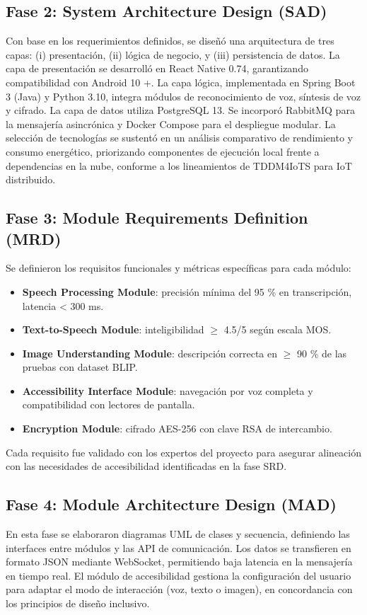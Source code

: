 \documentclass[lettersize,journal]{IEEEtran}
\begin{document}
        \subsection{Fase 2: System Architecture Design (SAD)}
        Con base en los requerimientos definidos, se diseñó una arquitectura de tres capas: (i) presentación, (ii) lógica de negocio, y (iii) persistencia de datos.  
        La capa de presentación se desarrolló en React Native 0.74, garantizando compatibilidad con Android 10 +.  
        La capa lógica, implementada en Spring Boot 3 (Java) y Python 3.10, integra módulos de reconocimiento de voz, síntesis de voz y cifrado.  
        La capa de datos utiliza PostgreSQL 13. Se incorporó RabbitMQ para la mensajería asincrónica y Docker Compose para el despliegue modular.  
        La selección de tecnologías se sustentó en un análisis comparativo de rendimiento y consumo energético, priorizando componentes de ejecución local frente a dependencias en la nube, conforme a los lineamientos de TDDM4IoTS para IoT distribuido.
        
        \subsection{Fase 3: Module Requirements Definition (MRD)}
        Se definieron los requisitos funcionales y métricas específicas para cada módulo:  
        \begin{itemize}
            \item \textbf{Speech Processing Module}: precisión mínima del 95 \% en transcripción, latencia < 300 ms.  
            \item \textbf{Text-to-Speech Module}: inteligibilidad $\geq$ 4.5/5 según escala MOS.  
            \item \textbf{Image Understanding Module}: descripción correcta en $\geq$ 90 \% de las pruebas con dataset BLIP. 
            \item \textbf{Accessibility Interface Module}: navegación por voz completa y compatibilidad con lectores de pantalla.  
            \item \textbf{Encryption Module}: cifrado AES-256 con clave RSA de intercambio.  
        \end{itemize}
        Cada requisito fue validado con los expertos del proyecto para asegurar alineación con las necesidades de accesibilidad identificadas en la fase SRD.
        
        \subsection{Fase 4: Module Architecture Design (MAD)}
        En esta fase se elaboraron diagramas UML de clases y secuencia, definiendo las interfaces entre módulos y las API de comunicación.  
        Los datos se transfieren en formato JSON mediante WebSocket, permitiendo baja latencia en la mensajería en tiempo real.  
        El módulo de accesibilidad gestiona la configuración del usuario para adaptar el modo de interacción (voz, texto o imagen), en concordancia con los principios de diseño inclusivo.
        
\end{document}
